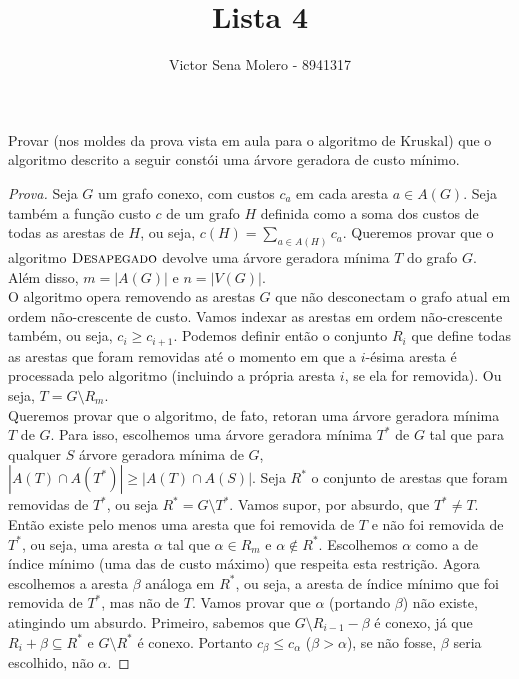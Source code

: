 \documentclass[12pt]{article}
\newenvironment{problem}[2][Ex]{\begin{trivlist}
\item[\hskip \labelsep {\bfseries #1}\hskip \labelsep {\bfseries #2.}]}{\end{trivlist}}
\begin{document}
 
 
\title{Lista 4}
\author{Victor Sena Molero - 8941317}
\maketitle

\begin{problem}{16}
Provar (nos moldes da prova vista em aula para o algoritmo de Kruskal) que o algoritmo descrito a seguir constói uma árvore geradora de custo mínimo.
\end{problem}

\begin{proof}[Prova]
Seja $G$ um grafo conexo, com custos $c_a$ em cada aresta $a \in A(G)$. Seja também a função custo $c$ de um grafo $H$ definida como a soma dos custos de todas as arestas de $H$, ou seja, $c(H) = \sum_{a \in A(H)} c_a$. Queremos provar que o algoritmo $\textsc{Desapegado}$ devolve uma árvore geradora mínima $T$ do grafo $G$. Além disso, $m = |A(G)|$ e $n = |V(G)|$. \\
O algoritmo opera removendo as arestas $G$ que não desconectam o grafo atual em ordem não-crescente de custo. Vamos indexar as arestas em ordem não-crescente também, ou seja, $c_i \geq c_{i+1}$. Podemos definir então o conjunto $R_i$ que define todas as arestas que foram removidas até o momento em que a $i$-ésima aresta é processada pelo algoritmo (incluindo a própria aresta $i$, se ela for removida). Ou seja, $T = G \setminus R_m$. \\
Queremos provar que o algoritmo, de fato, retoran uma árvore geradora mínima $T$ de $G$. Para isso, escolhemos uma árvore geradora mínima $T^*$ de $G$ tal que para qualquer $S$ árvore geradora mínima de $G$, $|A(T) \cap A(T^*)| \geq |A(T) \cap A(S)|$. Seja $R^*$ o conjunto de arestas que foram removidas de $T^*$, ou seja $R^* = G \setminus T^*$. Vamos supor, por absurdo, que $T^* \neq T$. \\
Então existe pelo menos uma aresta que foi removida de $T$ e não foi removida de $T^*$, ou seja, uma aresta $\alpha$ tal que $\alpha \in R_m$ e $\alpha \notin R^*$. Escolhemos $\alpha$ como a de índice mínimo (uma das de custo máximo) que respeita esta restrição. Agora escolhemos a aresta $\beta$ análoga em $R^*$, ou seja, a aresta de índice mínimo que foi removida de $T^*$, mas não de $T$. Vamos provar que $\alpha$ (portando $\beta$) não existe, atingindo um absurdo. Primeiro, sabemos que $G \setminus R_{i-1} - \beta$ é conexo, já que $R_i + \beta \subseteq R^*$ e $G \setminus R^*$ é conexo. Portanto $c_\beta \leq c_\alpha$ ($\beta > \alpha$), se não fosse, $\beta$ seria escolhido, não $\alpha$.

\end{proof}
\end{document}
